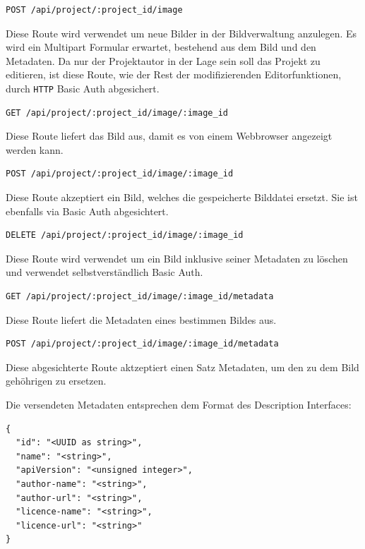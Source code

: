 \begin{verbatim}
POST /api/project/:project_id/image
\end{verbatim}

Diese Route wird verwendet um neue Bilder in der Bildverwaltung anzulegen. Es
wird ein Multipart Formular erwartet, bestehend aus dem Bild und den Metadaten.
Da nur der Projektautor in der Lage sein soll das Projekt zu editieren, ist
diese Route, wie der Rest der modifizierenden Editorfunktionen, durch
\texttt{HTTP} Basic Auth abgesichert.

\begin{verbatim}
GET /api/project/:project_id/image/:image_id
\end{verbatim}

Diese Route liefert das Bild aus, damit es von einem Webbrowser angezeigt werden kann.

\begin{verbatim}
POST /api/project/:project_id/image/:image_id
\end{verbatim}

Diese Route akzeptiert ein Bild, welches die gespeicherte Bilddatei ersetzt.
Sie ist ebenfalls via Basic Auth abgesichtert.

\begin{verbatim}
DELETE /api/project/:project_id/image/:image_id
\end{verbatim}

Diese Route wird verwendet um ein Bild inklusive seiner Metadaten zu löschen und
verwendet selbstverständlich Basic Auth.

\begin{verbatim}
GET /api/project/:project_id/image/:image_id/metadata
\end{verbatim}

Diese Route liefert die Metadaten eines bestimmen Bildes aus.

\begin{verbatim}
POST /api/project/:project_id/image/:image_id/metadata
\end{verbatim}

Diese abgesichterte Route aktzeptiert einen Satz Metadaten, um den zu dem Bild
gehöhrigen zu ersetzen.

Die versendeten Metadaten entsprechen dem Format des Description Interfaces:

\begin{verbatim}
{
  "id": "<UUID as string>",
  "name": "<string>",
  "apiVersion": "<unsigned integer>",
  "author-name": "<string>",
  "author-url": "<string>",
  "licence-name": "<string>",
  "licence-url": "<string>"
}
\end{verbatim}

